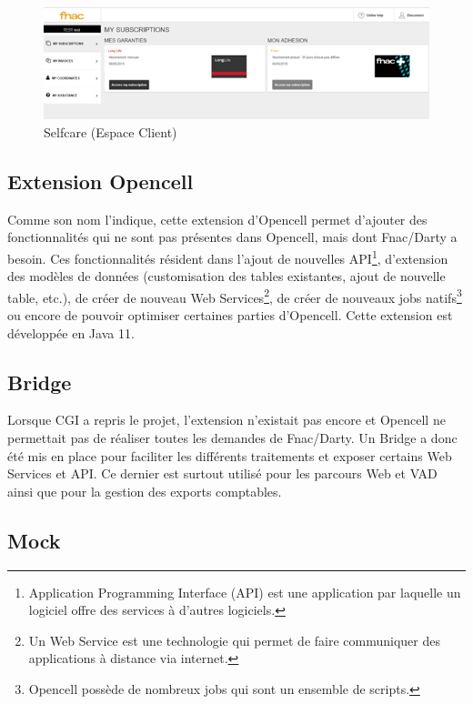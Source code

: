 \documentclass[12pt, a4paper]{report}
\begin{document}
	\begin{figure}[!h]
		\centering
		\includegraphics[width=1\textwidth]{assets/images/selfcare.png}
		\vspace{-.6cm}
		\caption{Selfcare (Espace Client)}
	\end{figure}

	\subsection{Extension Opencell}

	Comme son nom l'indique, cette extension d'Opencell permet d'ajouter des fonctionnalités qui ne sont pas présentes dans Opencell, mais dont Fnac/Darty a besoin. Ces fonctionnalités résident dans l'ajout de nouvelles API\footnote{Application Programming Interface (API) est une application par laquelle un logiciel offre des services à d'autres logiciels.}, d'extension des modèles de données (customisation des tables existantes, ajout de nouvelle table, etc.), de créer de nouveau Web Services\footnote{Un Web Service est une technologie qui permet de faire communiquer des applications à distance via internet.}, de créer de nouveaux jobs natifs\footnote{Opencell possède de nombreux jobs qui sont un ensemble de scripts.} ou encore de pouvoir optimiser certaines parties d'Opencell. Cette extension est développée en Java 11.

	\subsection{Bridge}

	Lorsque CGI a repris le projet, l'extension n'existait pas encore et Opencell ne permettait pas de réaliser toutes les demandes de Fnac/Darty. Un Bridge a donc été mis en place pour faciliter les différents traitements et exposer certains Web Services et API. Ce dernier est surtout utilisé pour les parcours Web et VAD ainsi que pour la gestion des exports comptables.

	\subsection{Mock}
\end{document}
